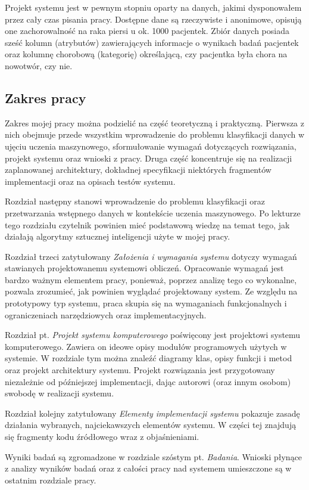 \documentclass[../thesis.tex]{subfiles}
\begin{document}
Projekt systemu jest w pewnym stopniu oparty na danych, jakimi dysponowałem przez cały czas pisania pracy. Dostępne dane są rzeczywiste i anonimowe, opisują one zachorowalność na raka piersi u ok. 1000 pacjentek. Zbiór danych posiada sześć kolumn (atrybutów) zawierających informacje o wynikach badań pacjentek oraz kolumnę chorobową (kategorię) określającą, czy pacjentka była chora na nowotwór, czy nie.

\subsection{Zakres pracy}

Zakres mojej pracy można podzielić na część teoretyczną i praktyczną. Pierwsza z nich obejmuje przede wszystkim wprowadzenie do problemu klasyfikacji danych w ujęciu uczenia maszynowego, sformułowanie wymagań dotyczących rozwiązania, projekt systemu oraz wnioski z pracy. Druga część koncentruje się na realizacji zaplanowanej architektury, dokładnej specyfikacji niektórych fragmentów implementacji oraz na opisach testów systemu. 

Rozdział następny stanowi wprowadzenie do problemu klasyfikacji oraz przetwarzania wstępnego danych w kontekście uczenia maszynowego. Po lekturze tego rozdziału czytelnik powinien mieć podstawową wiedzę na temat tego, jak działają algorytmy sztucznej inteligencji użyte w mojej pracy.

Rozdział trzeci zatytułowany \emph{Założenia i wymagania systemu} dotyczy wymagań stawianych projektowanemu systemowi obliczeń. Opracowanie wymagań jest bardzo ważnym elementem pracy, ponieważ, poprzez analizę tego co wykonalne, pozwala zrozumieć, jak powinien wyglądać projektowany system. Ze względu na prototypowy typ systemu, praca skupia się na wymaganiach funkcjonalnych i ograniczeniach narzędziowych oraz implementacyjnych.

Rozdział pt. \emph{Projekt systemu komputerowego} poświęcony jest projektowi systemu komputerowego. Zawiera on ideowe opisy modułów programowych użytych w systemie. W rozdziale tym można znaleźć diagramy klas, opisy funkcji i metod oraz projekt architektury systemu. Projekt rozwiązania jest przygotowany niezależnie od późniejszej implementacji, dając autorowi (oraz innym osobom) swobodę w realizacji systemu.

Rozdział kolejny zatytułowany \emph{Elementy implementacji systemu} pokazuje zasadę działania wybranych, najciekawszych elementów systemu. W części tej znajdują się fragmenty kodu źródłowego wraz z objaśnieniami.

Wyniki badań są zgromadzone w rozdziale szóstym pt. \emph{Badania}. Wnioski płynące z analizy wyników badań oraz z całości pracy nad systemem umieszczone są w ostatnim rozdziale pracy.
\end{document}
